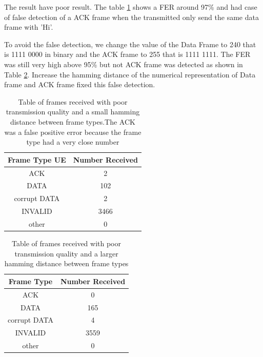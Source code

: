 The result have poor result. The table \ref{tab:2ACK} shows a FER around 97\% and had case of false detection of a ACK frame when the transmitted only send
the same data frame with 'Hi'.  


To avoid the false detection, we change the value of the Data Frame to 240 that is 1111 0000 in binary and the ACK frame to 255 that is 1111 1111.
The FER was still very high above 95\% but not ACK frame was detected as shown in Table \ref{tab:0ACK}. Increase the hamming distance of the numerical representation of Data frame and ACK frame 
fixed this false detection.
 




\begin{table}[ht]
	\centering
		\begin{tabular}{| c | c | }
		\hline                       
		Frame Type UE & Number Received\\
		\hline
			ACK & 2\\
			DATA & 102\\
			corrupt DATA & 2\\
			INVALID & 3466\\
			other & 0\\
		\hline
		\end{tabular}
	\caption{Table of frames received with poor transmission quality and a small hamming distance between frame types.The ACK was a false positive error because the frame type had a very close number}
	\label{tab:2ACK}
\end{table}

\begin{table}[ht]
	\centering
		\begin{tabular}{| c | c | }
		\hline                       
		Frame Type & Number Received\\
		\hline
			ACK & 0\\
			DATA & 165\\
			corrupt DATA & 4\\
			INVALID & 3559\\
			other & 0\\
		\hline
		\end{tabular}
	\caption{Table of frames received with poor transmission quality and a larger hamming distance between frame types}
	\label{tab:0ACK}
\end{table}
